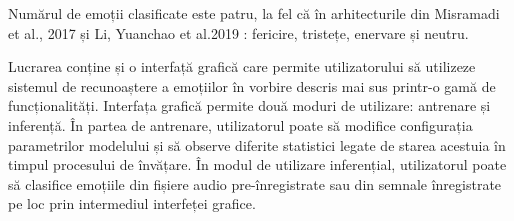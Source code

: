 \documentclass[a4paper,12pt]{book}
\begin{document}
					Numărul de emoții clasificate este patru, la fel că în arhitecturile din Misramadi et al., 2017 \cite{misramadi} și	Li, Yuanchao et al.2019 \cite{yuan}: fericire, tristețe, enervare și neutru. \par
					
					Lucrarea conține și o interfață grafică care permite utilizatorului să utilizeze sistemul de recunoaștere a emoțiilor în vorbire descris mai sus printr-o gamă de funcționalități. Interfața grafică permite două moduri de utilizare: antrenare și inferență. În partea de antrenare, utilizatorul poate să modifice configurația parametrilor modelului și să observe diferite statistici legate de starea acestuia în timpul procesului de învățare. În modul de utilizare inferențial, utilizatorul poate să clasifice emoțiile din fișiere audio pre-înregistrate sau din semnale înregistrate pe loc prin intermediul interfeței grafice.\par			
							
\end{document}
